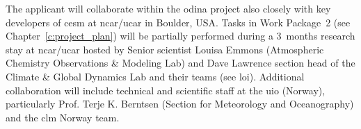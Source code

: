 
The applicant will collaborate within the \gls{odina} project also closely with key developers of \gls{cesm} at \gls{ncar/ucar} in Boulder, USA. Tasks in Work Package~2 (see Chapter~\ref{c:project_plan}) will be partially performed during a 3~months research stay at \gls{ncar}/\gls{ucar} hosted by Senior scientist Louisa Emmons (Atmospheric Chemistry Observations \& Modeling Lab) and Dave Lawrence section head of the Climate \& Global Dynamics Lab and their teams (see \gls{loi}). Additional collaboration will include technical and scientific staff at the \gls{uio} (Norway), particularly Prof. Terje K. Berntsen (Section for Meteorology and Oceanography) and the \gls{clm} Norway team. 
